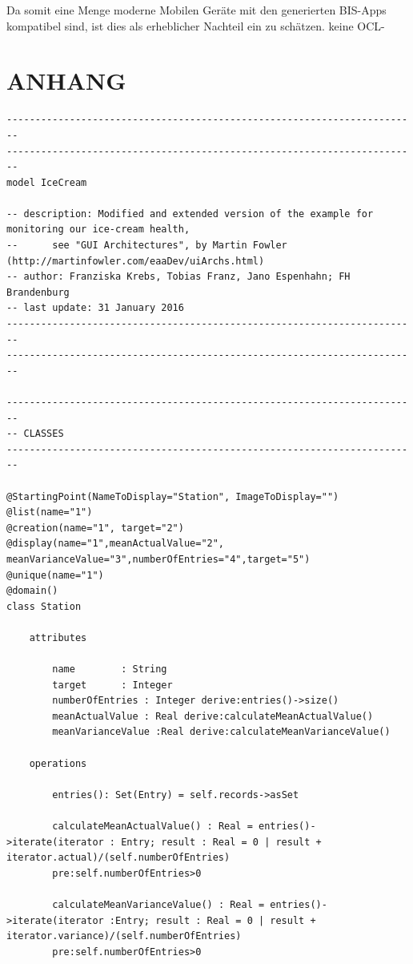 \documentclass[a4paper,twoside]{article}
\begin{document}
 Da somit eine Menge moderne Mobilen Geräte mit den generierten BIS-Apps kompatibel sind, ist dies als erheblicher Nachteil ein zu schätzen.
keine OCL-
\vfill

{\small
}
\newpage
\section*{\uppercase{Anhang}}
\onecolumn
\begin{lstlisting}[caption={Vollständige USE-Spezifikation des IceCream Modells},label=lst:completeUSE]
------------------------------------------------------------------------
------------------------------------------------------------------------
model IceCream

-- description: Modified and extended version of the example for monitoring our ice-cream health,
-- 		see "GUI Architectures", by Martin Fowler (http://martinfowler.com/eaaDev/uiArchs.html)
-- author: Franziska Krebs, Tobias Franz, Jano Espenhahn; FH Brandenburg
-- last update: 31 January 2016
------------------------------------------------------------------------
------------------------------------------------------------------------

------------------------------------------------------------------------
-- CLASSES
------------------------------------------------------------------------

@StartingPoint(NameToDisplay="Station", ImageToDisplay="")
@list(name="1")
@creation(name="1", target="2")
@display(name="1",meanActualValue="2", meanVarianceValue="3",numberOfEntries="4",target="5")
@unique(name="1")
@domain()
class Station

	attributes

		name		: String
		target		: Integer
		numberOfEntries : Integer derive:entries()->size()
		meanActualValue : Real derive:calculateMeanActualValue()
		meanVarianceValue :Real derive:calculateMeanVarianceValue()
		
	operations
	
		entries(): Set(Entry) = self.records->asSet
	  
		calculateMeanActualValue() : Real = entries()->iterate(iterator : Entry; result : Real = 0 | result + iterator.actual)/(self.numberOfEntries) 
		pre:self.numberOfEntries>0

		calculateMeanVarianceValue() : Real = entries()->iterate(iterator :Entry; result : Real = 0 | result + iterator.variance)/(self.numberOfEntries) 
		pre:self.numberOfEntries>0
		

\end{lstlisting}
\end{document}
